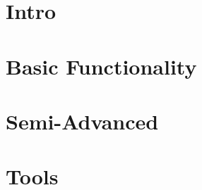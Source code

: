 \begin{frame}
 \titlepage
\end{frame}

\section{Intro}

\section{Basic Functionality}

\section{Semi-Advanced}

\section{Tools}

